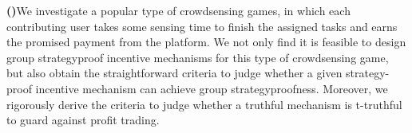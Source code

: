 \documentclass[conference]{IEEEtran}
\theoremstyle{definition}
\begin{document}
\newcount\itemcount
{}\relax
\def\bolditem{\par{\bf(\the\itemcount)}\enspace\advance{}\relax}

\bolditem We investigate a popular type of crowdsensing games, in which each contributing user takes some sensing time to finish the assigned tasks and earns the promised payment from the platform. We not only find it is feasible to design group strategyproof incentive mechanisms for this type of crowdsensing game, but also obtain the straightforward criteria to judge whether a given strategy-proof incentive mechanism can achieve group strategyproofness. Moreover, we rigorously derive the criteria to judge whether a truthful mechanism is t-truthful to guard against profit trading. %
\end{document}
